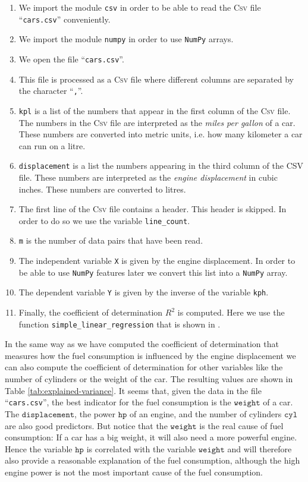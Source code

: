 \begin{enumerate}
\item We import the module \texttt{csv} in order to be able to read the \textsc{Csv} file ``\texttt{cars.csv}''
      conveniently.
\item We import the module \texttt{numpy} in order to use \texttt{NumPy} arrays.
\item We open the file ``\texttt{cars.csv}''.
\item This file is processed as a \textsc{Csv} file where different columns are separated by the character 
      ``\texttt{,}''.
\item \texttt{kpl} is a list of the numbers that appear in the first column of the \textsc{Csv} file.
      The numbers in the \textsc{Csv} file are interpreted as the \emph{miles per gallon} of a car.
      These numbers are converted into metric units, i.e. how many kilometer a car can run on a litre.
\item \texttt{displacement} is a list the numbers appearing in the third column of the \textsc{CSV} file.
      These numbers are interpreted as the \emph{engine displacement} in cubic inches.
      These numbers are converted to litres.
\item The first line of the \textsc{Csv} file contains a header.  This header is skipped.
      In order to do so we use the variable \texttt{line\_count}.
\item \texttt{m} is the number of data pairs that have been read.
\item The independent variable \texttt{X} is given by the engine displacement. 
      In order to be able to use \texttt{NumPy} features later we convert this list into a \texttt{NumPy} array.
\item The dependent variable \texttt{Y} is given by the inverse of the variable \texttt{kph}.
\item Finally, the coefficient of determination $R^2$ is computed. Here we use the function \hspace*{\fill} \linebreak
      \texttt{simple\_linear\_regression} that is shown in .
\end{enumerate}
In the same way as we have computed the coefficient of determination that measures how the fuel consumption is
influenced by the engine displacement we can also compute the coefficient of determination for other variables
like the number of cylinders or the weight of the car.  
The resulting values are shown in Table \ref{tab:explained-variance}.  It
seems that, given the data in the file ``\texttt{cars.csv}'', the best indicator for the fuel consumption is
the $\mathtt{weight}$ of a car.  The $\mathtt{displacement}$, the power $\mathtt{hp}$ of an engine, and the
number of cylinders $\mathtt{cyl}$ are also good predictors.  But notice that the $\mathtt{weight}$ is the real
cause of fuel consumption:  If a car has a big weight, it will also need a more powerful engine.  Hence the
variable $\mathtt{hp}$ is correlated with the variable $\mathtt{weight}$ and will therefore also provide a
reasonable explanation of the fuel consumption, although the high engine power is not the most important cause
of the fuel consumption. 


